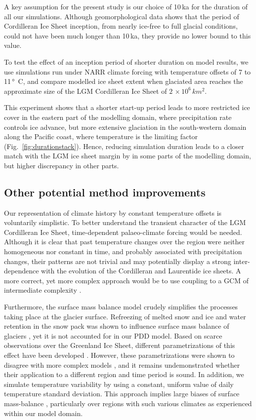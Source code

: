 A key assumption for the present study is our choice of 10\,ka for the duration of all our simulations. Although geomorphological data shows that the period of Cordilleran Ice Sheet inception, from nearly ice-free to full glacial conditions, could not have been much longer than 10\,ka, they provide no lower bound to this value.

To test the effect of an inception period of shorter duration on model results, we use simulations run under NARR climate forcing with temperature offsets of 7 to 11\,\unit{\degree C}, and compare modelled ice sheet extent when glaciated area reaches the approximate size of the LGM Cordilleran Ice Sheet of $2\,\times10^6\,\unit{km^2}$.

This experiment shows that a shorter start-up period leads to more restricted ice cover in the eastern part of the modelling domain, where precipitation rate controls ice advance, but more extensive glaciation in the south-western domain along the Pacific coast, where temperature is the limiting factor (Fig.~\ref{fig:durationstack}). Hence, reducing simulation duration leads to a closer match with the LGM ice sheet margin by \citet{dyke-2004} in some parts of the modelling domain, but higher discrepancy in other parts.

\subsection{Other potential method improvements}

Our representation of climate history by constant temperature offsets is voluntarily simplistic. To better understand the transient character of the LGM Cordilleran Ice Sheet, time-dependent palaeo-climate forcing would be needed. Although it is clear that past temperature changes over the region were neither homogeneous nor constant in time, and probably associated with precipitation changes, their patterns are not trivial and may potentially display a strong inter-dependence with the evolution of the Cordilleran and Laurentide ice sheets. A more correct, yet more complex approach would be to use coupling to a GCM of intermediate complexity \citep{yoshimori-etal-2001,calov-etal-2002,abeouchi-etal-2007,charbit-etal-2013}.

Furthermore, the surface mass balance model crudely simplifies the processes taking place at the glacier surface. Refreezing of melted snow and ice and water retention in the snow pack was shown to influence surface mass balance of glaciers \citep{trabant-mayo-1985}, yet it is not accounted for in our PDD model. Based on scarce observations over the Greenland Ice Sheet, different parametrizations of this effect have been developed \citep{janssens-huybrechts-2000,fausto-etal-2009b}. However, these parametrizations were shown to disagree with more complex models \citep{reijmer-etal-2012}, and it remains undemonstrated whether their application to a different region and time period is sound. In addition, we simulate temperature variability by using a constant, uniform value of daily temperature standard deviation. This approach implies large biases of surface mass-balance \citep{charbit-etal-2013,rau-rogozhina-2013,seguinot-2013}, particularly over regions with such various climates as experienced within our model domain.
